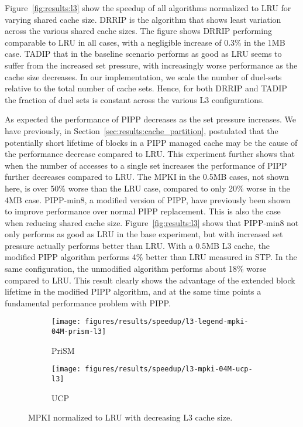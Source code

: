 Figure~\ref{fig:results:l3} show the speedup of all algorithms normalized to LRU for varying shared cache size.
DRRIP is the algorithm that shows least variation across the various shared cache sizes.
The figure shows DRRIP performing comparable to LRU in all cases, with a negligible increase of 0.3\% in the 1MB case.
TADIP that in the baseline scenario performs as good as LRU seems to suffer from the increased set pressure, with increasingly worse performance as the cache size decreases.
In our implementation, we scale the number of duel-sets relative to the total number of cache sets.
Hence, for both DRRIP and TADIP the fraction of duel sets is constant across the various L3 configurations.

As expected the performance of PIPP decreases as the set pressure increases.
We have previously, in Section~\ref{sec:results:cache_partition}, postulated that the potentially short lifetime of blocks in a PIPP managed cache may be the cause of the performance decrease compared to LRU.
This experiment further shows that when the number of accesses to a single set increases the performance of PIPP further decreases compared to LRU.
The MPKI in the 0.5MB cases, not shown here, is over 50\% worse than the LRU case, compared to only 20\% worse in the 4MB case.
PIPP-min8, a modified version of PIPP, have previously been shown to improve performance over normal PIPP replacement.
This is also the case when reducing shared cache size.
Figure~\ref{fig:results:l3} shows that PIPP-min8 not only performs as good as LRU in the base experiment, but with increased set pressure actually performs better than LRU.
With a 0.5MB L3 cache, the modified PIPP algorithm performs 4\% better than LRU measured in STP.
In the same configuration, the unmodified algorithm performs about 18\% worse compared to LRU.
This result clearly shows the advantage of the extended block lifetime in the modified PIPP algorithm, and at the same time points a fundamental performance problem with PIPP.


\begin{figure}[t]
    \centering
    \begin{subfigure}[b]{0.5\textwidth}
        \centering
        \texttt{[image: figures/results/speedup/l3-legend-mpki-04M-prism-l3]}
        \caption{PriSM}
        \label{fig:results:l3:mpki-prism}
    \end{subfigure}%
    \begin{subfigure}[b]{0.5\textwidth}
        \centering
        \texttt{[image: figures/results/speedup/l3-mpki-04M-ucp-l3]}
        \caption{UCP}
        \label{fig:results:l3:mpki-ucp}
    \end{subfigure}
    \label{fig:results:l3:mpki}
    \caption{MPKI normalized to LRU with decreasing L3 cache size.}
\end{figure}

